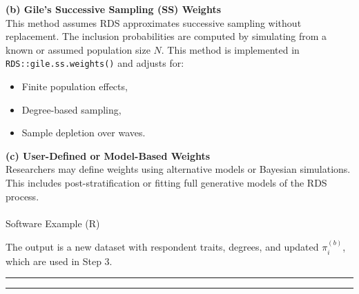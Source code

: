 \documentclass[
  12pt,
  letterpaper,
  DIV=11,
  numbers=noendperiod]{scrartcl}
\makeatletter
\let\oldparagraph\paragraph
\renewcommand{\paragraph}{
    \@ifstar
      \xxxParagraphStar
      \xxxParagraphNoStar
  }
\newcommand{\xxxParagraphStar}[1]{\oldparagraph*{#1}\mbox{}}
\newcommand{\xxxParagraphNoStar}[1]{\oldparagraph{#1}\mbox{}}
\newenvironment{Shaded}{\begin{snugshade}}{\end{snugshade}}
\newcommand{\AttributeTok}[1]{\textcolor[rgb]{0.40,0.45,0.13}{#1}}
\newcommand{\DecValTok}[1]{\textcolor[rgb]{0.68,0.00,0.00}{#1}}
\newcommand{\FunctionTok}[1]{\textcolor[rgb]{0.28,0.35,0.67}{#1}}
\newcommand{\NormalTok}[1]{\textcolor[rgb]{0.00,0.23,0.31}{#1}}
\newcommand{\OtherTok}[1]{\textcolor[rgb]{0.00,0.23,0.31}{#1}}
\newcommand{\SpecialCharTok}[1]{\textcolor[rgb]{0.37,0.37,0.37}{#1}}
\newcommand{\StringTok}[1]{\textcolor[rgb]{0.13,0.47,0.30}{#1}}
\theoremstyle{plain}
\theoremstyle{definition}
\makeatother
\begin{document}
\textbf{(b) Gile's Successive Sampling (SS) Weights}\\
This method assumes RDS approximates successive sampling without
replacement. The inclusion probabilities are computed by simulating from
a known or assumed population size \(N\). This method is implemented in
\texttt{RDS::gile.ss.weights()} and adjusts for:

\begin{itemize}
\item
  Finite population effects,
\item
  Degree-based sampling,
\item
  Sample depletion over waves.
\end{itemize}

\textbf{(c) User-Defined or Model-Based Weights}\\
Researchers may define weights using alternative models or Bayesian
simulations. This includes post-stratification or fitting full
generative models of the RDS process.

\paragraph{Software Example (R)}\label{software-example-r}

\begin{Shaded}
\end{Shaded}

The output is a new dataset with respondent traits, degrees, and updated
\(\pi_i^{(b)}\), which are used in Step 3.

\begin{center}\rule{0.5\linewidth}{0.5pt}\end{center}

\begin{center}\rule{0.5\linewidth}{0.5pt}\end{center}
\end{document}

